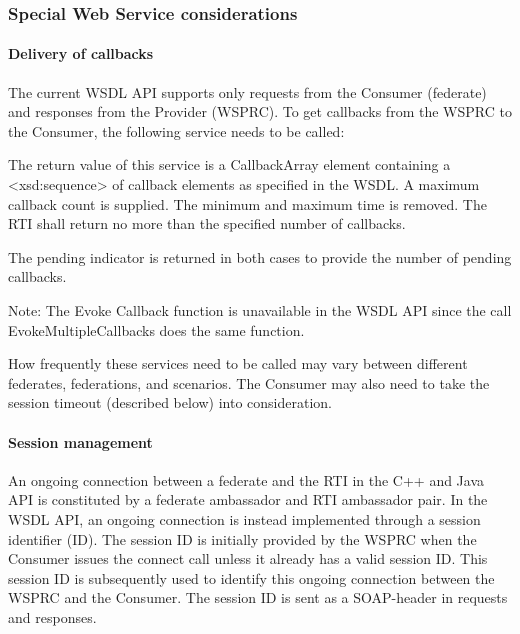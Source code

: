 \begin{compactstdpage}
    \subsubsection{Special Web Service considerations}

    \paragraph{Delivery of callbacks}

    The current WSDL API supports only requests from the Consumer (federate) and responses from the Provider (WSPRC). To get callbacks from the WSPRC to the Consumer, the following service needs to be called:

    The return value of this service is a CallbackArray element containing a \textless{}xsd:sequence\textgreater{} of callback elements as specified in the WSDL. A maximum callback count is supplied. The minimum and maximum time is removed. The RTI shall return no more than the specified number of callbacks.

    The pending indicator is returned in both cases to provide the number of pending callbacks.

    Note: The Evoke Callback function is unavailable in the WSDL API since the call EvokeMultipleCallbacks does the same function.

    How frequently these services need to be called may vary between different federates, federations, and scenarios. The Consumer may also need to take the session timeout (described below) into consideration.

    \paragraph{Session management}

    An ongoing connection between a federate and the RTI in the C++ and Java API is constituted by a federate ambassador and RTI ambassador pair. In the WSDL API, an ongoing connection is instead implemented through a session identifier (ID). The session ID is initially provided by the WSPRC when the Consumer issues the connect call unless it already has a valid session ID. This session ID is subsequently used to identify this ongoing connection between the WSPRC and the Consumer. The session ID is sent as a SOAP-header in requests and responses.


\end{compactstdpage}
